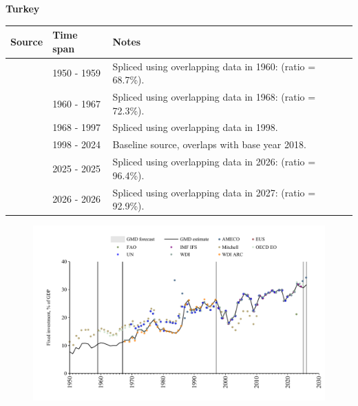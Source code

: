 \documentclass[12pt,a4paper,landscape]{article}
\begin{document}
\begin{adjustbox}{max totalsize={\paperwidth}{\paperheight},center}
\begin{minipage}[t][\textheight][t]{\textwidth}
\vspace*{0.5cm}
{}
\begin{center}
{\Large\bfseries Turkey}
\end{center}
\vspace{0.5cm}
\begin{table}[H]
\centering
\small
\begin{tabular}{|l|l|l|}
\hline
\textbf{Source} & \textbf{Time span} & \textbf{Notes} \\
\hline
\rowcolor{white}\cite{Mitchell}& 1950 - 1959 &Spliced using overlapping data in 1960: (ratio = 68.7\%).\\
\rowcolor{lightgray}\cite{OECD_EO}& 1960 - 1967 &Spliced using overlapping data in 1968: (ratio = 72.3\%).\\
\rowcolor{white}\cite{WDI}& 1968 - 1997 &Spliced using overlapping data in 1998.\\
\rowcolor{lightgray}\cite{EUS}& 1998 - 2024 &Baseline source, overlaps with base year 2018.\\
\rowcolor{white}\cite{OECD_EO}& 2025 - 2025 &Spliced using overlapping data in 2026: (ratio = 96.4\%).\\
\rowcolor{lightgray}\cite{AMECO}& 2026 - 2026 &Spliced using overlapping data in 2027: (ratio = 92.9\%).\\
\hline
\end{tabular}
\end{table}
\begin{figure}[H]
\centering
\includegraphics[width=\textwidth,height=0.6\textheight,keepaspectratio]{graphs/TUR_finv_GDP.pdf}
\end{figure}
\end{minipage}
\end{adjustbox}
\end{document}
